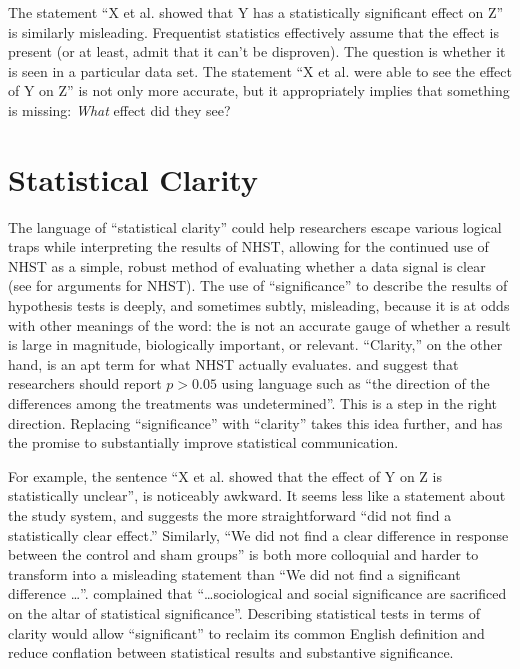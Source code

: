 The statement ``X et al. showed that Y has a statistically significant effect on Z'' is similarly misleading.
Frequentist statistics effectively assume that the effect is present (or at least, admit that it can't be disproven).
The question is whether it is seen in a particular data set.
The statement ``X et al. were able to see the effect of Y on Z'' is not only more accurate, but it appropriately implies that something is missing: \emph{What} effect did they see?

\section*{Statistical Clarity}

The language of ``statistical clarity'' could help researchers escape various logical traps while interpreting the results of NHST, allowing for the continued use of NHST as a simple, robust method of evaluating whether a data signal is clear (see \citealt{Abelson1997} for arguments for NHST).
The use of ``significance'' to describe the results of hypothesis tests is deeply, and sometimes subtly, misleading, because it is at odds with other meanings of the word: the \pval is not an accurate gauge of whether a result is large in magnitude, biologically important, or relevant. ``Clarity,'' on the other hand, is an apt term for what NHST actually evaluates. 
\citet{jones2000sensible} and \citet{robinson2001past} suggest that researchers should report $p > 0.05$ using language such as ``the direction of the differences among the treatments was undetermined''. This is a step in the right direction. 
Replacing ``significance'' with ``clarity'' takes this idea further, and has the promise to substantially improve statistical communication.

For example, the sentence ``X et al. showed that the effect of Y on Z is statistically unclear'', is noticeably awkward. It seems less like a statement about the study system, and suggests the more straightforward ``did not find a statistically clear effect.''
Similarly, ``We did not find a clear difference in response between the control and sham groups'' is both more colloquial and harder to transform into a misleading statement than ``We did not find a significant difference \ldots''.
\citet{Bernardietal.2017} complained that ``\ldots sociological and social significance are sacrificed on the altar of statistical significance''.
Describing statistical tests in terms of clarity would allow ``significant'' to reclaim its common English definition and reduce conflation between statistical results and substantive significance.

